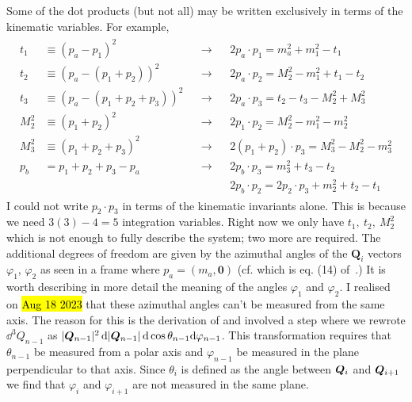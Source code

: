
Some of the dot products (but not all) may be written exclusively in terms of the kinematic variables. For example,
\begin{gather*}
    \begin{align*}
        t_1 &\equiv (p_a - p_1)^2 &&\rightarrow 
            && 2 p_a \cdot p_1 = m_a^2 +  m_1^2 - t_1 \\
        t_2 &\equiv (p_a - (p_1 + p_2))^2 &&\rightarrow 
            && 2 p_a \cdot p_2 = M_2^2 - m_1^2 + t_1 - t_2 \\
        t_3 &\equiv (p_a - (p_1 + p_2 + p_3))^2 &&\rightarrow 
            && 2 p_a \cdot p_3 = t_2 - t_3 - M_2^2 + M_3^2 \\
        M_2^2 &\equiv (p_1 + p_2)^2 &&\rightarrow 
            && 2 p_1 \cdot p_2 = M_2^2 - m_1^2 - m_2^2 \\
        M_3^2 &\equiv (p_1 + p_2 + p_3)^2 &&\rightarrow 
            && 2 (p_1 + p_2) \cdot p_3 = M_3^2 - M_2^2 - m_3^2 \\
        p_b &= p_1 + p_2 + p_3 - p_a &&\rightarrow
            && 2p_b \cdot p_3 = m_3^2 + t_3 - t_2 \\
        & && && 2p_b \cdot p_2 = 2 p_2 \cdot p_3 + m_2^2 + t_2 - t_1
    \end{align*}
\end{gather*}
I could not write $p_2 \cdot p_3$ in terms of the kinematic invariants alone.
This is because we need $3(3) - 4 = 5$ integration variables. Right now we only have $t_1,\ t_2,\ M_2^2$ which is not enough to fully describe the system; two more are required. 
The additional degrees of freedom are given by the azimuthal angles of the $\bm{Q}_i$ vectors $\varphi_1$, $\varphi_2$ as seen in a frame where $p_a = (m_a, \bm{0})$ (cf.  which is eq. (14) of~\cite{Byckling:1969sx}.)
It is worth describing in more detail the meaning of the angles $\varphi_1$ and $\varphi_2$. 
I realised on \hl{Aug 18 2023} that these azimuthal angles can't be measured from the same axis. 
The reason for this is the derivation of  and  involved a step where we rewrote $\dd^3 Q_{n-1}$ as $|\bm{Q}_{n-1}|^2 \, \dd |\bm{Q}_{n-1}| \, \dd \cos \theta_{n-1} \dd \varphi_{n-1}$. 
This transformation requires that $\theta_{n-1}$ be measured from a polar axis and $\varphi_{n-1}$ be measured in the plane perpendicular to that axis.
Since $\theta_{i}$ is defined as the angle between $\bm{Q}_{i}$ and $\bm{Q}_{i+1}$ we find that $\varphi_{i}$ and $\varphi_{i+1}$ are not measured in the same plane.

